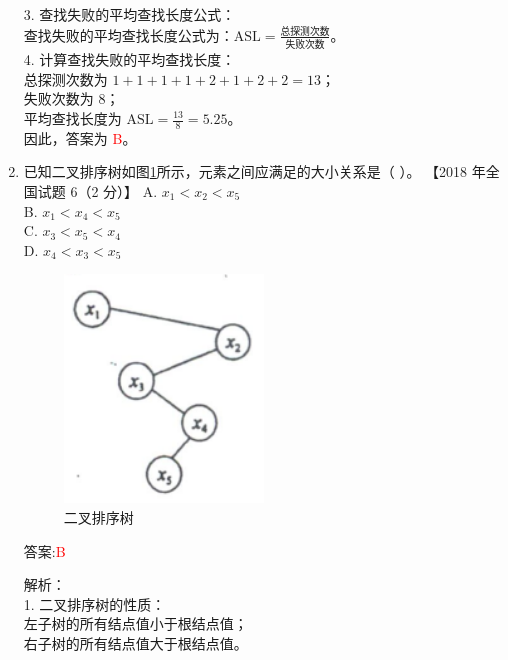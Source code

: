 \documentclass[lang=cn,newtx,10pt,scheme=chinese]{../../../elegantbook}
\begin{document}
\begin{enumerate}
    3. 查找失败的平均查找长度公式：\\
       查找失败的平均查找长度公式为：$\text{ASL} = \frac{\text{总探测次数}}{\text{失败次数}}$。\\

    4. 计算查找失败的平均查找长度：\\
        总探测次数为 $1 + 1 + 1 + 1 + 2 + 1 + 2 + 2 = 13$；\\
        失败次数为 8；\\
        平均查找长度为 $\text{ASL} = \frac{13}{8} = 5.25$。\\

    因此，答案为 \textcolor{red}{B}。\\



\item 已知二叉排序树如图\ref{fig:9-3}所示，元素之间应满足的大小关系是（ ）。  
    【2018 年全国试题 6（2 分）】  
    A. $x_1 < x_2 < x_5$ \\  
    B. $x_1 < x_4 < x_5$ \\  
    C. $x_3 < x_5 < x_4$ \\  
    D. $x_4 < x_3 < x_5$ \\  

    \begin{figure}[h!]
        \centering
        \includegraphics[width=0.5\textwidth]{../../figure/exercisePicPDF/chapter9/9-3.pdf}
        \caption{二叉排序树}
        \label{fig:9-3}
    \end{figure}

    答案:\textcolor{red}{B}

    解析：\\
    1. 二叉排序树的性质：\\
        左子树的所有结点值小于根结点值；\\
        右子树的所有结点值大于根结点值。\\


\end{enumerate}
\end{document}
